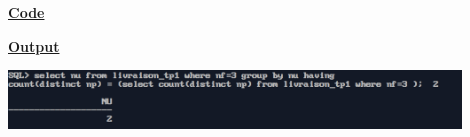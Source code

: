 \newpage
{}

\textbf{\underline{Code}}


\vspace{1cm}
\textbf{\underline{Output}}
\vspace{1cm}
\begin{center}
    \includegraphics[width=0.9\textwidth]{Questions/q36/q36.png}
\end{center}


